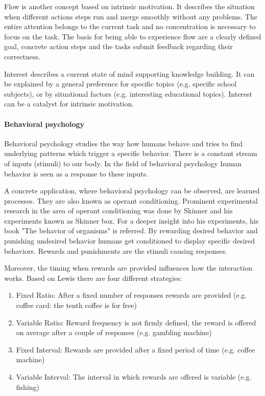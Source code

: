 \label{flow}
Flow is another concept based on intrinsic motivation. It describes the situation when different actions steps run and merge smoothly without any problems. The entire attention belongs to the current task and no concentration is necessary to focus on the task. The basis for being able to experience flow are a clearly defined goal, concrete action steps and the tasks submit feedback regarding their correctness. \cite[p. 19, 20, 21]{bierhoffeditorEnzyklopaediePsychologieSoziale2016}

Interest describes a current state of mind supporting knowledge building. It can be explained by a general preference for specific topics (e.g. specific school subjects), or by situational factors (e.g. interesting educational topics). Interest can be a catalyst for intrinsic motivation. \cite[p. 22, 23, 24]{bierhoffeditorEnzyklopaediePsychologieSoziale2016}

\paragraph*{Behavioral psychology}

Behavioral psychology studies the way how humans behave and tries to find underlying patterns which trigger a specific behavior. There is a constant stream of inputs (stimuli) to our body. In the field of  behavioral psychology human behavior is seen as a response to these inputs. \cite[p. 10]{lewisIrresistibleAppsMotivational2014}

A concrete application, where behavioral psychology can be observed, are learned processes. They are also known as operant conditioning. Prominent experimental research in the area of operant conditioning was done by Skinner and his experiments known as Skinner box. For a deeper insight into his experiments, his book "The behavior of organisms" \cite{skinnerBehaviorOrganisms1938} is referred. By rewarding desired behavior and punishing undesired behavior humans get conditioned to display specific desired behaviors. Rewards and punishments are the stimuli causing responses. \cite[p. 11]{lewisIrresistibleAppsMotivational2014}

Moreover, the timing when rewards are provided influences how the interaction works.
Based on Lewis \cite[p. 10]{lewisIrresistibleAppsMotivational2014} there are four different strategies:
\begin{enumerate}
	\item Fixed Ratio: After a fixed number of responses rewards are provided (e.g. coffee card: the tenth coffee is for free)
	\item Variable Ratio: Reward frequency is not firmly defined, the reward is offered on average after a couple of responses (e.g. gambling machine)
	\item Fixed Interval: Rewards are provided after a fixed period of time (e.g. coffee machine)
	\item Variable Interval: The interval in which rewards are offered is variable (e.g. fishing)
\end{enumerate}


